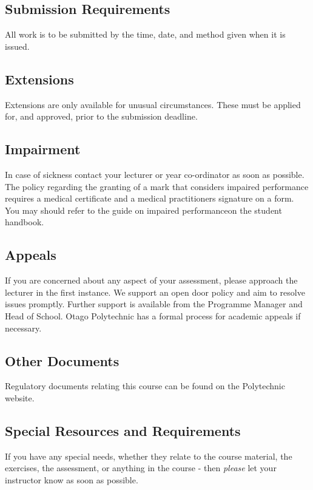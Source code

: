\documentclass{article}
\begin{document}
\subsection*{Submission Requirements}
All work is to be submitted by the time, date, and method given when it is issued.

\subsection*{Extensions}
Extensions are only available for unusual circumstances.  These must be applied for, and approved, prior to the submission deadline.

\subsection*{Impairment}
In case of sickness contact your lecturer or year co-ordinator as soon as possible.  The policy regarding the granting of a mark that considers impaired performance requires a medical certificate and a medical practitioners signature on a form. You may should refer to the guide on impaired performanceon the student handbook.

\subsection*{Appeals}
If you are concerned about any aspect of your assessment, please approach the lecturer in the first instance.  We support
an open door policy and aim to resolve issues promptly.  Further support is available from the Programme
Manager and Head of School. Otago Polytechnic has a formal process for academic appeals if necessary.

\subsection*{Other Documents}
Regulatory documents relating this course can be found on the Polytechnic website.

\subsection*{Special Resources and Requirements}
If you have any special needs, whether they relate to the course material, the exercises, the assessment, or anything in the course -
then \textit{please} let your instructor know as soon as possible.
\end{document}
